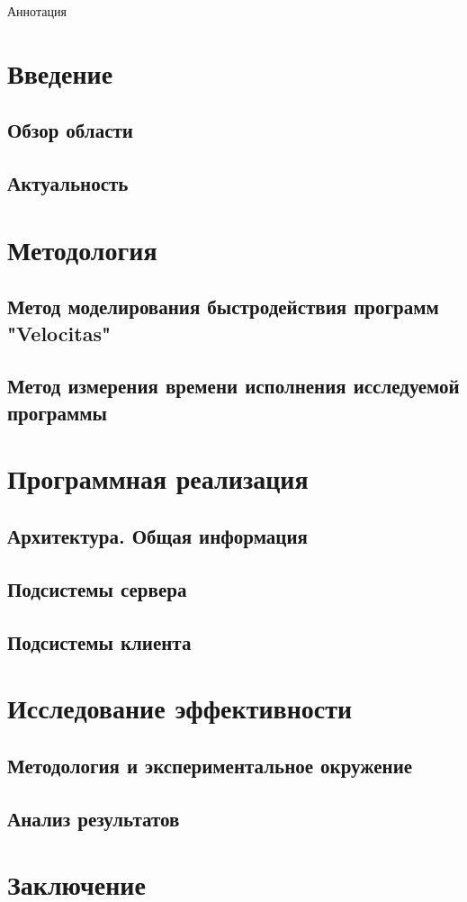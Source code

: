 \annotation
Аннотация

\section*{Введение}
\subsection{Обзор области}

\subsection{Актуальность}

\section{Методология}
\subsection{Метод моделирования быстродействия программ "Velocitas"}

\subsection{Метод измерения времени исполнения исследуемой программы}

\section{Программная реализация}
\subsection{Архитектура. Общая информация}

\subsection{Подсистемы сервера}

\subsection{Подсистемы клиента}

\section{Исследование эффективности}
\subsection{Методология и экспериментальное окружение}

\subsection{Анализ результатов}

\section*{Заключение}